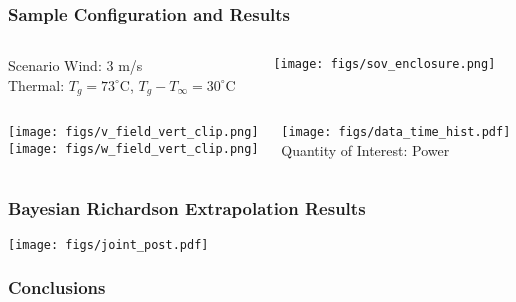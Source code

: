 \documentclass[mathserif]{beamer}
\begin{document}
%
%
%
\begin{frame}
\frametitle{Sample Configuration and Results}
%
\vspace{-0.1in}
\begin{columns}
  \begin{column}{0.32\linewidth}
    \begin{block}{Scenario}
    Wind: $3$ m/s\\
    Thermal: $T_g = 73^{\circ}$C, $T_g - T_{\infty}= 30^{\circ}$C
    \end{block}
  \end{column}
  \begin{column}{0.7\linewidth}
    \begin{center}
      \texttt{[image: figs/sov\_enclosure.png]}
    \end{center}
  \end{column}
\end{columns}
%
\vspace{-0.25in}
\begin{columns}
  \begin{column}{0.5\linewidth}
    \begin{center}
      \texttt{[image: figs/v\_field\_vert\_clip.png]}\\
      \vspace{-0.0in}
      \texttt{[image: figs/w\_field\_vert\_clip.png]}
    \end{center}
  \end{column}
  \begin{column}{0.5\linewidth}
    \begin{center}
      \texttt{[image: figs/data\_time\_hist.pdf]}\\
      Quantity of Interest: Power
    \end{center}
  \end{column}
\end{columns}
%
\end{frame}

%
%
%
\begin{frame}
\frametitle{Bayesian Richardson Extrapolation Results}
%
\begin{center}
\texttt{[image: figs/joint\_post.pdf]}
\end{center}
%
\end{frame}
%
%
%



 \begin{frame}
   \frametitle{Conclusions}

   \begin{block}{}
     \\
    \end{block}

 \end{frame}

 
\end{document}
